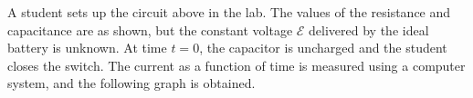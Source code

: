 \documentclass{../../oss-apphys-exam}
\begin{document}
\begin{questions}
%  


  \question A student sets up the circuit above in the lab. The values of the
  resistance and capacitance are as shown, but the constant voltage
  $\mathcal{E}$ delivered by the ideal battery is unknown. At time $t=0$, the
  capacitor is uncharged and the student closes the switch. The current as a
  function of time is measured using a computer system, and the following graph
  is obtained.
\end{questions}
\end{document}
